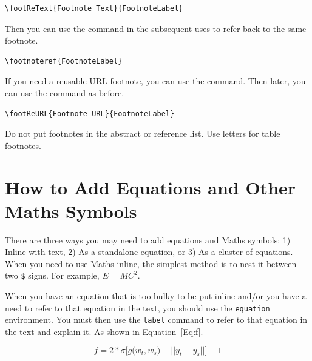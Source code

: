 \documentclass[12pt]{uomthesis}
\begin{document}
\begin{indentedQuote}
\begin{verbatim}
\footReText{Footnote Text}{FootnoteLabel}
\end{verbatim}
\end{indentedQuote}

Then you can use the  command in the subsequent uses to refer back to the same footnote.

\begin{indentedQuote}
\begin{verbatim}
\footnoteref{FootnoteLabel}
\end{verbatim}
\end{indentedQuote}

If you need a reusable URL footnote, you can use the  command. Then later, you can use the  command as before.

\begin{indentedQuote}
\begin{verbatim}
\footReURL{Footnote URL}{FootnoteLabel}
\end{verbatim}
\end{indentedQuote}

Do not put footnotes in the abstract or reference list. Use letters for table footnotes.

\section{How to Add Equations and Other Maths Symbols}
There are three ways you may need to add equations and Maths symbols: 1) Inline with text, 2) As a standalone equation, or 3) As a cluster of equations. When you need to use Maths inline, the simplest method is to nest it between two \verb|$| signs. For example, $E=MC^2$.

When you have an equation that is too bulky to be put inline and/or you have a need to refer to that equation in the text, you should use the \texttt{equation} environment. You must then use the \texttt{label} command to refer to that equation in the text and explain it. As shown in Equation~\ref{Eq:f}.

\begin{equation}
f = 2 * \sigma\big[ g \big( w_t, w_s \big) - || y_t - y_s|| \big] -1
\label{Eq:f}
\end{equation}
\end{document}
